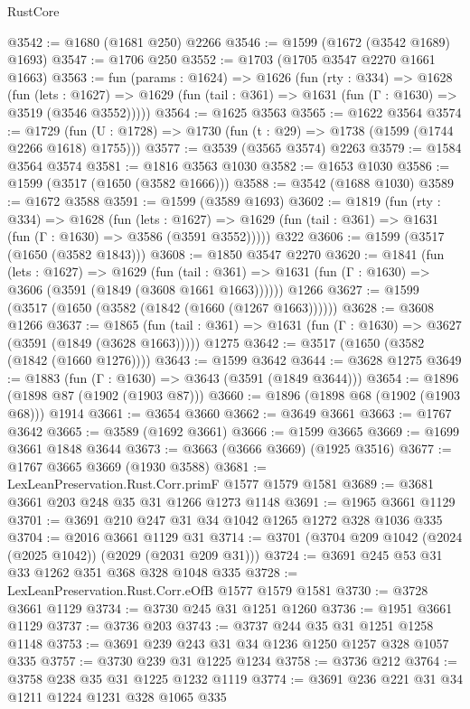 \begin{lexlean}{RustCore}
\begin{coremodule}
@3542 := @1680 (@1681 @250) @2266
@3546 := @1599 (@1672 (@3542 @1689) @1693)
@3547 := @1706 @250
@3552 := @1703 (@1705 @3547 @2270 @1661 @1663)
@3563 := fun (params : @1624) =>
  @1626
    (fun (rty : @334) =>
    @1628
      (fun (lets : @1627) =>
      @1629 (fun (tail : @361) => @1631 (fun (Γ : @1630) => @3519 (@3546 @3552)))))
@3564 := @1625 @3563
@3565 := @1622 @3564
@3574 := @1729 (fun (U : @1728) => @1730 (fun (t : @29) => @1738 (@1599 (@1744 @2266 @1618) @1755)))
@3577 := @3539 (@3565 @3574) @2263
@3579 := @1584 @3564 @3574
@3581 := @1816 @3563 @1030
@3582 := @1653 @1030
@3586 := @1599 (@3517 (@1650 (@3582 @1666)))
@3588 := @3542 (@1688 @1030)
@3589 := @1672 @3588
@3591 := @1599 (@3589 @1693)
@3602 := @1819
    (fun (rty : @334) =>
    @1628
      (fun (lets : @1627) =>
      @1629 (fun (tail : @361) => @1631 (fun (Γ : @1630) => @3586 (@3591 @3552)))))
    @322
@3606 := @1599 (@3517 (@1650 (@3582 @1843)))
@3608 := @1850 @3547 @2270
@3620 := @1841
    (fun (lets : @1627) =>
    @1629
      (fun (tail : @361) => @1631 (fun (Γ : @1630) => @3606 (@3591 (@1849 (@3608 @1661 @1663))))))
    @1266
@3627 := @1599 (@3517 (@1650 (@3582 (@1842 (@1660 (@1267 @1663))))))
@3628 := @3608 @1266
@3637 := @1865
    (fun (tail : @361) => @1631 (fun (Γ : @1630) => @3627 (@3591 (@1849 (@3628 @1663)))))
    @1275
@3642 := @3517 (@1650 (@3582 (@1842 (@1660 @1276))))
@3643 := @1599 @3642
@3644 := @3628 @1275
@3649 := @1883 (fun (Γ : @1630) => @3643 (@3591 (@1849 @3644)))
@3654 := @1896 (@1898 @87 (@1902 (@1903 @87)))
@3660 := @1896 (@1898 @68 (@1902 (@1903 @68))) @1914
@3661 := @3654 @3660
@3662 := @3649 @3661
@3663 := @1767 @3642
@3665 := @3589 (@1692 @3661)
@3666 := @1599 @3665
@3669 := @1699 @3661 @1848 @3644
@3673 := @3663 (@3666 @3669) (@1925 @3516)
@3677 := @1767 @3665 @3669 (@1930 @3588)
@3681 := LexLeanPreservation.Rust.Corr.primF @1577 @1579 @1581
@3689 := @3681 @3661 @203 @248 @35 @31 @1266 @1273 @1148
@3691 := @1965 @3661 @1129
@3701 := @3691 @210 @247 @31 @34 @1042 @1265 @1272 @328 @1036 @335
@3704 := @2016 @3661 @1129 @31
@3714 := @3701 (@3704 @209 @1042 (@2024 (@2025 @1042)) (@2029 (@2031 @209 @31)))
@3724 := @3691 @245 @53 @31 @33 @1262 @351 @368 @328 @1048 @335
@3728 := LexLeanPreservation.Rust.Corr.eOfB @1577 @1579 @1581
@3730 := @3728 @3661 @1129
@3734 := @3730 @245 @31 @1251 @1260
@3736 := @1951 @3661 @1129
@3737 := @3736 @203
@3743 := @3737 @244 @35 @31 @1251 @1258 @1148
@3753 := @3691 @239 @243 @31 @34 @1236 @1250 @1257 @328 @1057 @335
@3757 := @3730 @239 @31 @1225 @1234
@3758 := @3736 @212
@3764 := @3758 @238 @35 @31 @1225 @1232 @1119
@3774 := @3691 @236 @221 @31 @34 @1211 @1224 @1231 @328 @1065 @335

\end{coremodule}
\end{lexlean}
